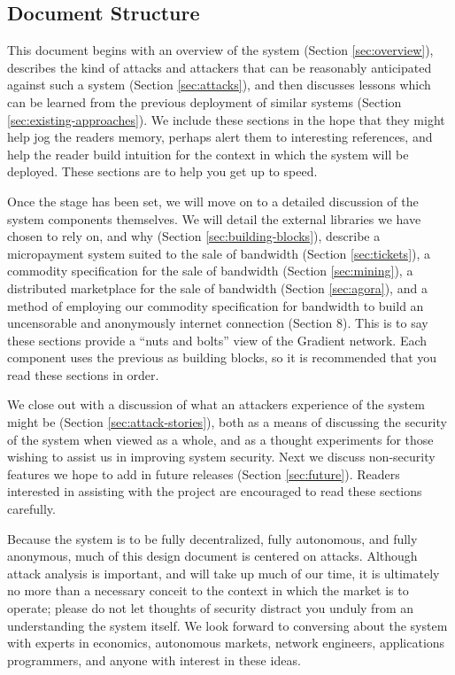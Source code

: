 \documentclass{article}
\begin{document}
\subsection{Document Structure}

This document begins with an overview of the system (Section \ref{sec:overview}), describes the kind of attacks and attackers that can be reasonably anticipated against such a system (Section \ref{sec:attacks}), and then discusses lessons which can be learned from the previous deployment of similar systems (Section \ref{sec:existing-approaches}). We include these sections in the hope that they might help jog the readers memory, perhaps alert them to interesting references, and help the reader build intuition for the context in which the system will be deployed. These sections are to help you get up to speed.

Once the stage has been set, we will move on to a detailed discussion of the system components themselves. We will detail the external libraries we have chosen to rely on, and why (Section \ref{sec:building-blocks}), describe a micropayment system suited to the sale of bandwidth (Section \ref{sec:tickets}), a commodity specification for the sale of bandwidth (Section \ref{sec:mining}), a distributed marketplace for the sale of bandwidth (Section \ref{sec:agora}), and a method of employing our commodity specification for bandwidth to build an uncensorable and anonymously internet connection (Section 8). This is to say these sections provide a “nuts and bolts” view of the Gradient network. Each component uses the previous as building blocks, so it is recommended that you read these sections in order.

We close out with a discussion of what an attackers experience of the system might be (Section \ref{sec:attack-stories}), both as a means of discussing the security of the system when viewed as a whole, and as a thought experiments for those wishing to assist us in improving system security. Next we discuss non-security features we hope to add in future releases (Section \ref{sec:future}). Readers interested in assisting with the project are encouraged to read these sections carefully.

Because the system is to be fully decentralized, fully autonomous, and fully anonymous, much of this design document is centered on attacks. Although attack analysis is important, and will take up much of our time, it is ultimately no more than a necessary conceit to the context in which the market is to operate; please do not let thoughts of security distract you unduly from an understanding the system itself. We look forward to conversing about the system with experts in economics, autonomous markets, network engineers, applications programmers, and anyone with interest in these ideas.
\end{document}
